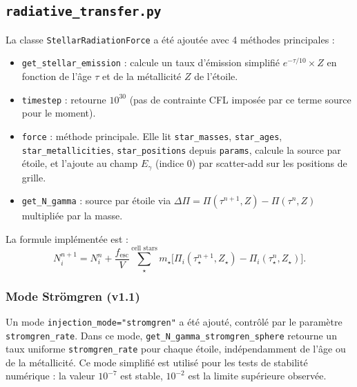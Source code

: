 \documentclass[a4paper, 11pt]{article}
\begin{document}
\subsection{\texttt{radiative\_transfer.py}}
La classe \texttt{StellarRadiationForce} a été ajoutée avec 4 méthodes principales :
    \begin{itemize}
        \item \texttt{get\_stellar\_emission} : calcule un taux d'émission simplifié $e^{-\tau/10} \times Z$ en fonction de l'âge $\tau$ et de la métallicité $Z$ de l'étoile.
        \item \texttt{timestep} : retourne $10^{30}$ (pas de contrainte CFL imposée par ce terme source pour le moment).
        \item \texttt{force} : méthode principale. Elle lit \texttt{star\_masses}, \texttt{star\_ages}, \texttt{star\_metallicities}, \texttt{star\_positions} depuis \texttt{params}, calcule la source par étoile, et l'ajoute au champ $E_\gamma$ (indice 0) par scatter-add sur les positions de grille.
        \item \texttt{get\_N\_gamma} : source par étoile via $\Delta\Pi = \Pi(\tau^{n+1}, Z) - \Pi(\tau^n, Z)$ multipliée par la masse.
    \end{itemize}

La formule implémentée est :
\begin{equation}
    N_i^{n+1} = N_i^{n}
    + \frac{f_{\mathrm{esc}}}{V}
    \sum_{\star}^{\text{cell stars}} m_{\star}
    \bigl[ \Pi_i(\tau_{\star}^{n+1}, Z_{\star}) - \Pi_i(\tau_{\star}^{n}, Z_{\star}) \bigr].
    \label{eq:stellar_injection}
\end{equation}

\subsubsection*{Mode Strömgren (v1.1)}
Un mode \texttt{injection\_mode="stromgren"} a été ajouté, contrôlé par le paramètre \texttt{stromgren\_rate}. Dans ce mode, \texttt{get\_N\_gamma\_stromgren\_sphere} retourne un taux uniforme \texttt{stromgren\_rate} pour chaque étoile, indépendamment de l'âge ou de la métallicité. Ce mode simplifié est utilisé pour les tests de stabilité numérique : la valeur $10^{-7}$ est stable, $10^{-2}$ est la limite supérieure observée.
\end{document}
